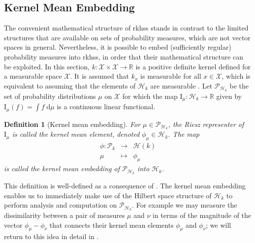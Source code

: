 \documentclass[12pt,paper=letter]{scrreprt}
\newtheorem{definition}{Definition}[chapter]
\begin{document}
\subsection{Kernel Mean Embedding}
\label{subsec: kernel mean embed}

The convenient mathematical structure of \acp{rkhs} stands in contrast to the limited structures that are available on sets of probability measures, which are not vector spaces in general.
Nevertheless, it is possible to embed (sufficiently regular) probability measures into \acp{rkhs}, in order that their mathematical structure can be exploited.
In this section, $k : \mathcal{X} \times \mathcal{X} \rightarrow \mathbb{R}$ is a positive definite kernel defined for a measurable space $\mathcal{X}$.
It is assumed that $k_x$ is measurable for all $x \in \mathcal{X}$, which is equivalent to assuming that the elements of $\mathcal{H}_k$ are measurable \citep[Lemma 4.24]{steinwart2008support}.
Let $\mathcal{P}_{\mathcal{H}_k}$ be the set of probability distributions $\mu$ on $\mathcal{X}$ for which the map $\mathrm{I}_\mu : \mathcal{H}_k \rightarrow \mathbb{R}$ given by $\mathrm{I}_\mu (f) = \int f \; \mathrm{d}\mu$ is a continuous linear functional.

\begin{definition}[Kernel mean embedding]
\label{def: kernel mean element}
For $\mu \in \mathcal{P}_{\mathcal{H}_k}$, the Riesz representer of $\mathrm{I}_\mu$ is called the \emph{kernel mean element}, denoted $\phi_\mu \in \mathcal{H}_k$.
The map
\begin{eqnarray*}
    \phi : \mathcal{P}_k & \rightarrow & \mathcal{H}(k) \\
    \mu & \mapsto & \phi_\mu
\end{eqnarray*}
is called the \emph{kernel mean embedding} of $\mathcal{P}_{\mathcal{H}_k}$ into $\mathcal{H}_k$.
\end{definition}

This definition is well-defined as a consequence of .
The kernel mean embedding enables us to immediately make use of the Hilbert space structure of $\mathcal{H}_k$ to perform analysis and computation on $\mathcal{P}_{\mathcal{H}_k}$.
For example we may measure the dissimilarity between a pair of measures $\mu$ and $\nu$ in terms of the magnitude of the vector $\phi_\mu - \phi_\nu$ that connects their kernel mean elements $\phi_\mu$ and $\phi_\nu$; we will return to this idea in detail in .
\end{document}
